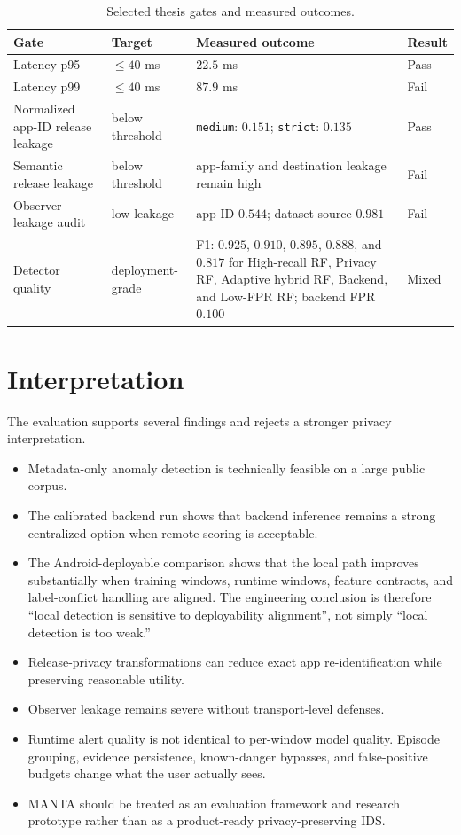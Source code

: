 \begin{table}[htbp]
  \centering
  \caption{Selected thesis gates and measured outcomes.}
  \label{tab:gates}
  \scriptsize
  \begin{tabular}{@{}p{3.0cm}p{2.4cm}p{6.3cm}p{1.2cm}@{}}
    \toprule
    Gate & Target & Measured outcome & Result \\
    \midrule
    Latency p95 & \(\leq 40\) ms & \(22.5\) ms & Pass \\
    Latency p99 & \(\leq 40\) ms & \(87.9\) ms & Fail \\
    Normalized app-ID release leakage & below threshold & \texttt{medium}: \(0.151\); \texttt{strict}: \(0.135\) & Pass \\
    Semantic release leakage & below threshold & app-family and destination leakage remain high & Fail \\
    Observer-leakage audit & low leakage & app ID \(0.544\); dataset source \(0.981\) & Fail \\
    Detector quality & deployment-grade & F1: \(0.925\), \(0.910\), \(0.895\), \(0.888\), and \(0.817\) for High-recall RF, Privacy RF, Adaptive hybrid RF, Backend, and Low-FPR RF; backend FPR \(0.100\) & Mixed \\
    \bottomrule
  \end{tabular}
\end{table}

\section{Interpretation}
The evaluation supports several findings and rejects a stronger privacy interpretation.
\begin{itemize}[leftmargin=*]
  \item Metadata-only anomaly detection is technically feasible on a large public corpus.
  \item The calibrated backend run shows that backend inference remains a strong centralized option
  when remote scoring is acceptable.
  \item The Android-deployable comparison shows that the local path improves substantially when
  training windows, runtime windows, feature contracts, and label-conflict handling are aligned. The
  engineering conclusion is therefore ``local detection is sensitive to deployability alignment'',
  not simply ``local detection is too weak.''
  \item Release-privacy transformations can reduce exact app re-identification while preserving
  reasonable utility.
  \item Observer leakage remains severe without transport-level defenses.
  \item Runtime alert quality is not identical to per-window model quality. Episode grouping,
  evidence persistence, known-danger bypasses, and false-positive budgets change what the user
  actually sees.
  \item MANTA should be treated as an evaluation framework and research prototype rather than as a
  product-ready privacy-preserving IDS.
\end{itemize}
